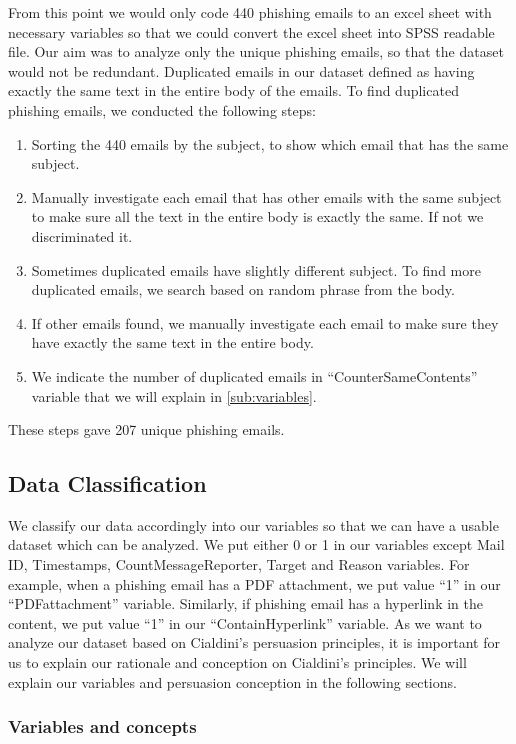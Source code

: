 From this point we would only code 440 phishing emails to an excel
sheet with necessary variables so that we could convert the excel
sheet into SPSS readable file. Our aim was to analyze only the unique
phishing emails, so that the dataset would not be redundant. Duplicated
emails in our dataset defined as having exactly the same text in the
entire body of the emails. To find duplicated phishing emails, we
conducted the following steps:
\begin{enumerate}
\item Sorting the 440 emails by the subject, to show which email that has
the same subject.
\item Manually investigate each email that has other emails with the same
subject to make sure all the text in the entire body is exactly the
same. If not we discriminated it.
\item Sometimes duplicated emails have slightly different subject. To find
more duplicated emails, we search based on random phrase from the
body.
\item If other emails found, we manually investigate each email to make
sure they have exactly the same text in the entire body.
\item We indicate the number of duplicated emails in ``CounterSameContents''
variable that we will explain in \autoref{sub:variables}.
\end{enumerate}
These steps gave 207 unique phishing emails.


\subsection{Data Classification}

We classify our data accordingly into our variables so that we can
have a usable dataset which can be analyzed. We put either 0 or 1
in our variables except Mail ID, Timestamps, CountMessageReporter,
Target and Reason variables. For example, when a phishing email has
a PDF attachment, we put value ``1'' in our ``PDFattachment''
variable. Similarly, if phishing email has a hyperlink in the content,
we put value ``1'' in our ``ContainHyperlink'' variable. As we
want to analyze our dataset based on Cialdini's persuasion principles,
it is important for us to explain our rationale and conception on
Cialdini's principles. We will explain our variables and persuasion
conception in the following sections.


\subsubsection{\label{sub:variables}Variables and concepts}


